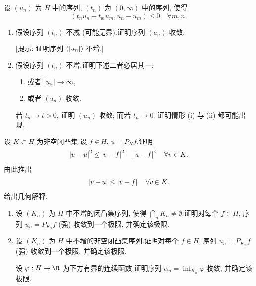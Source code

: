 \begin{exercise}
\label{exer:5.3}
设 $(u_n)$ 为 $H$ 中的序列, $(t_n)$ 为 $(0,\infty)$ 中的序列, 使得
\begin{equation*}
(t_nu_n-t_mu_m,u_n-u_m)\le0\quad\forall m,n.
\end{equation*}
\begin{enumerate}[label=\arabic*., leftmargin=2.2em, itemsep=0.3em]
	\item 假设序列 $(t_n)$ 不减 (可能无界).证明序列 $(u_n)$ 收敛.

	      [提示: 证明序列 $(\left|u_n\right|)$ 不增.]
	\item 假设序列 $(t_n)$ 不增.证明下述二者必居其一:
	      \begin{enumerate}[label=(\roman*), leftmargin=2.4em, itemsep=0.1em]
	      	\item 或者 $\left|u_n\right|\to\infty$,
	      	\item 或者 $(u_n)$ 收敛.
	      \end{enumerate}
	      若 $t_n\to t>0$, 证明 $(u_n)$ 收敛; 而若 $t_n\to0$, 证明情形 (i)
	      与 (ii) 都可能出现.
\end{enumerate}
\end{exercise}

\begin{exercise}
\label{exer:5.4}
设 $K\subset H$ 为非空闭凸集.设 $f\in H$, $u=P_Kf$.证明
\begin{equation*}
\left|v-u\right|^2\le\left|v-f\right|^2-\left|u-f\right|^2\quad\forall v\in K.
\end{equation*}
由此推出
\begin{equation*}
\left|v-u\right|\le\left|v-f\right|\quad\forall v\in K.
\end{equation*}
给出几何解释.
\end{exercise}

\begin{exercise}
\label{exer:5.5}
\begin{enumerate}[label=\arabic*., leftmargin=2.2em, itemsep=0.3em]
	\item 设 $(K_n)$ 为 $H$ 中不增的闭凸集序列, 使得
	      $\bigcap_nK_n\ne\emptyset$.证明对每个 $f\in H$, 序列
	      $u_n=P_{K_n}f$ (强) 收敛到一个极限, 并确定该极限.
	\item 设 $(K_n)$ 为 $H$ 中不增的非空闭凸集序列.证明对每个 $f\in H$,
	      序列 $u_n=P_{K_n}f$ (强) 收敛到一个极限, 并确定该极限.

	      设 $\varphi:H\to\R$ 为下方有界的连续函数.证明序列
	      $\alpha_n=\inf_{K_n}\varphi$ 收敛, 并确定该极限.
\end{enumerate}
\end{exercise}

